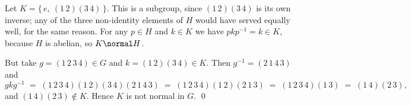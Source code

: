 \documentclass[11pt]{article}
\begin{document}
\medskip
\noindent Let $K = \{\, e,\ (1\,2)(3\,4) \,\}$. This is a subgroup, since
$(1\,2)(3\,4)$ is its own inverse; any of the three non-identity elements of $H$
would have served equally well, for the same reason. For any $p \in H$ and
$k \in K$ we have $p k p^{-1} = k \in K$, because $H$ is abelian, so
$K \normal H$.

\medskip
\noindent But take $g = (1\,2\,3\,4) \in G$ and $k = (1\,2)(3\,4) \in K$. Then
$g^{-1} = (2\,1\,4\,3)$ and
\[
  g k g^{-1}
  \;=\; (1\,2\,3\,4)(1\,2)(3\,4)(2\,1\,4\,3)
  \;=\; (1\,2\,3\,4)(1\,2)(2\,1\,3)
  \;=\; (1\,2\,3\,4)(1\,3)
  \;=\; (1\,4)(2\,3),
\]
and $(1\,4)(2\,3) \notin K$. Hence $K$ is not normal in $G$. \qed
\end{document}
